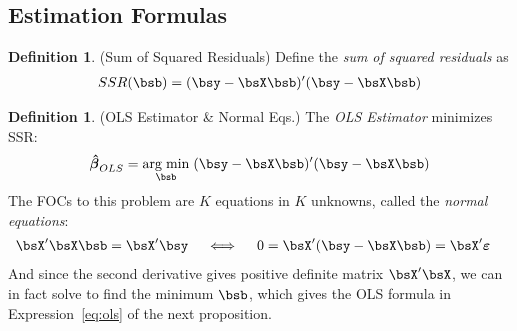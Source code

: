\documentclass[12pt]{article}
\theoremstyle{plain}
\theoremstyle{definition}
\newtheorem{defn}[thm]{Definition}
\theoremstyle{remark}
\newcommand{\bsvarepsilon}{\boldsymbol{\varepsilon}}
\newcommand{\bshatbeta}{\boldsymbol{\hat{\beta}}}
\DeclareMathOperator*{\argmin}{arg\;min}
\begin{document}
\clearpage
\subsection{Estimation Formulas}

\begin{defn}(Sum of Squared Residuals)
Define the \emph{sum of squared residuals} as
\begin{align*}
  SSR(\bsb) = (\bsy - \bsX \bsb)'(\bsy - \bsX \bsb)
\end{align*}
\end{defn}


\begin{defn}(OLS Estimator \& Normal Eqs.)
\label{defn:ols}
The \emph{OLS Estimator} minimizes SSR:
\begin{align*}
  \bshatbeta_{OLS}
  =
  \argmin_{\bsb} \;
  (\bsy - \bsX \bsb)'(\bsy - \bsX \bsb)
\end{align*}
The FOCs to this problem are $K$ equations in $K$ unknowns, called the
\emph{normal equations}:
\begin{align}
  \bsX'\bsX\bsb &= \bsX'\bsy
  \quad\iff\quad
  0= \bsX'(\bsy-\bsX\bsb) = \bsX'\bsvarepsilon
  \label{normalequations}
\end{align}
And since the second derivative gives positive definite matrix
$\bsX'\bsX$, we can in fact solve to find the minimum $\bsb$, which
gives the OLS formula in Expression~\ref{eq:ols} of the next
proposition.
\end{defn}
\end{document}
